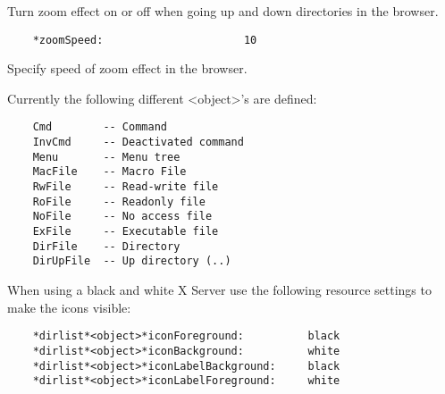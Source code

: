    Turn zoom effect on or off when going up and down directories in the
   browser.

\begin{verbatim}
    *zoomSpeed:                      10
\end{verbatim}

   Specify speed of zoom effect in the browser.

   Currently the following different <object>'s are defined:

\begin{verbatim}
    Cmd        -- Command
    InvCmd     -- Deactivated command
    Menu       -- Menu tree
    MacFile    -- Macro File
    RwFile     -- Read-write file
    RoFile     -- Readonly file
    NoFile     -- No access file
    ExFile     -- Executable file
    DirFile    -- Directory
    DirUpFile  -- Up directory (..)
\end{verbatim}

   When using a black and white X Server use the following resource settings
   to make the icons visible:

\begin{verbatim}
    *dirlist*<object>*iconForeground:          black
    *dirlist*<object>*iconBackground:          white
    *dirlist*<object>*iconLabelBackground:     black
    *dirlist*<object>*iconLabelForeground:     white
\end{verbatim}


